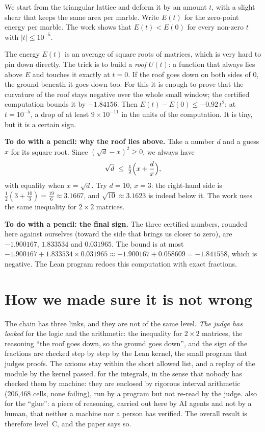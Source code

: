 We start from the triangular lattice and deform it by an amount $t$, with a slight shear that
keeps the same area per marble. Write $E(t)$ for the zero-point energy per marble. The work
shows that $E(t)<E(0)$ for every non-zero $t$ with $|t|\le 10^{-5}$.

The energy $E(t)$ is an average of square roots of matrices, which is very hard to pin down
directly. The trick is to build a \emph{roof} $U(t)$: a function that always lies above $E$ and
touches it exactly at $t=0$. If the roof goes down on both sides of $0$, the ground beneath it
goes down too. For this it is enough to prove that the curvature of the roof stays negative over
the whole small window; the certified computation bounds it by $-1.84156$. Then
$E(t)-E(0)\le -0.92\,t^2$: at $t=10^{-5}$, a drop of at least $9\times10^{-11}$ in the units of
the computation. It is tiny, but it is a certain sign.

\begin{encadre}
\textbf{To do with a pencil: why the roof lies above.} Take a number $d$ and a guess $x$ for its
square root. Since $(\sqrt d - x)^2\ge 0$, we always have
\[\sqrt d\;\le\;\tfrac12\Bigl(x+\frac{d}{x}\Bigr),\]
with equality when $x=\sqrt d$. Try $d=10$, $x=3$: the right-hand side is
$\tfrac12(3+\tfrac{10}{3})=\tfrac{19}{6}\approx3.1667$, and $\sqrt{10}\approx3.1623$ is indeed
below it. The work uses the same inequality for $2\times2$ matrices.

\textbf{To do with a pencil: the final sign.} The three certified numbers, rounded here
against ourselves (toward the side that brings us closer to zero), are $-1.900167$,
$1.833534$ and $0.031965$. The bound is at most
$-1.900167+1.833534\times0.031965\approx-1.900167+0.058609=-1.841558$,
which is negative. The Lean program redoes this computation with exact fractions.
\end{encadre}

\section*{How we made sure it is not wrong}

The chain has three links, and they are not of the same level.
 \emph{The judge has looked} for the logic and the arithmetic: the inequality for
$2\times2$ matrices, the reasoning ``the roof goes down, so the ground goes down'', and the sign
of the fractions are checked step by step by the Lean kernel, the small program that judges
proofs. The axioms stay within the short allowed list, and a replay of the module by the kernel
passed.
 for the integrals, in the sense that nobody has checked them by machine: they are
enclosed by rigorous interval arithmetic (206,468 cells, none failing), run by a program but not
re-read by the judge.  also for the ``glue'': a piece of reasoning, carried out here
by AI agents and not by a human, that neither a machine nor a person has verified. The overall
result is therefore level~C, and the paper says so.

